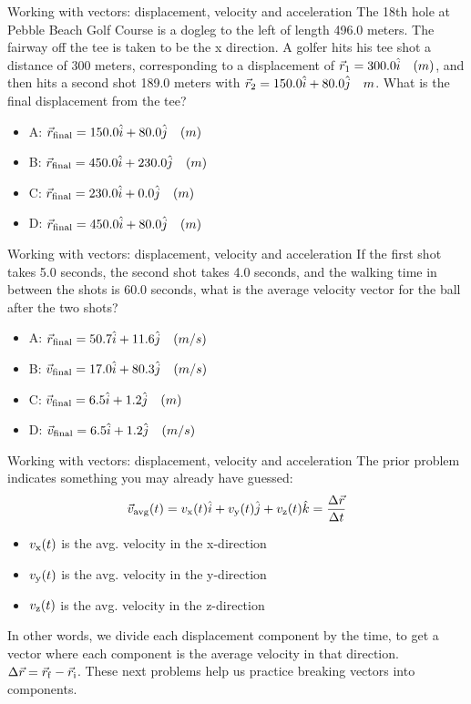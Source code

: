 \documentclass{beamer}
\begin{document}
\begin{frame}{Working with vectors: displacement, velocity and acceleration}
\small
The 18th hole at Pebble Beach Golf Course is a dogleg to the left of length 496.0 meters.  The fairway off the tee is taken to be the x direction.  A golfer hits his tee shot a distance of 300 meters, corresponding to a displacement of $\vec{r}_{\rm 1} = 300.0 \hat{i} \quad (m)$, and then hits a second shot 189.0 meters with $\vec{r}_{\rm 2} = 150.0 \hat{i} + 80.0 \hat{j} \quad m$.  What is the final displacement from the tee?
\begin{itemize}
\item A: $\vec{r}_{\rm final} = 150.0 \hat{i} + 80.0\hat{j}\quad (m)$
\item B: $\vec{r}_{\rm final} = 450.0 \hat{i} + 230.0\hat{j}\quad (m)$
\item C: $\vec{r}_{\rm final} = 230.0 \hat{i} + 0.0\hat{j}\quad (m)$
\item D: $\vec{r}_{\rm final} = 450.0 \hat{i} + 80.0\hat{j}\quad (m)$
\end{itemize}
\end{frame}

\begin{frame}{Working with vectors: displacement, velocity and acceleration}
\small
If the first shot takes 5.0 seconds, the second shot takes 4.0 seconds, and the walking time in between the shots is 60.0 seconds, what is the average velocity vector for the ball after the two shots?
\begin{itemize}
\item A: $\vec{r}_{\rm final} = 50.7 \hat{i} + 11.6\hat{j}\quad (m/s)$
\item B: $\vec{v}_{\rm final} = 17.0 \hat{i} + 80.3\hat{j}\quad (m/s)$
\item C: $\vec{v}_{\rm final} = 6.5 \hat{i} + 1.2\hat{j}\quad (m)$
\item D: $\vec{v}_{\rm final} = 6.5 \hat{i} + 1.2\hat{j}\quad (m/s)$
\end{itemize}
\end{frame}

\begin{frame}{Working with vectors: displacement, velocity and acceleration}
The prior problem indicates something you may already have guessed:
\begin{equation}
\vec{v}_{\rm avg}(t) = v_{\rm x}(t) \hat{i} + v_{\rm y}(t) \hat{j} + v_{\rm z}(t) \hat{k} = \frac{\Delta\vec{r}}{\Delta t}
\label{eq:vel}
\end{equation}
\begin{itemize}
\item $v_{\rm x}(t)$ is the avg. velocity in the x-direction
\item $v_{\rm y}(t)$ is the avg. velocity in the y-direction
\item $v_{\rm z}(t)$ is the avg. velocity in the z-direction
\end{itemize}
In other words, we divide each displacement component by the time, to get a vector where each component is the average velocity in that direction.  $\Delta\vec{r} = \vec{r}_{\rm f} - \vec{r}_{\rm i}$.  These next problems help us practice breaking vectors into components.
\end{frame}
\end{document}
